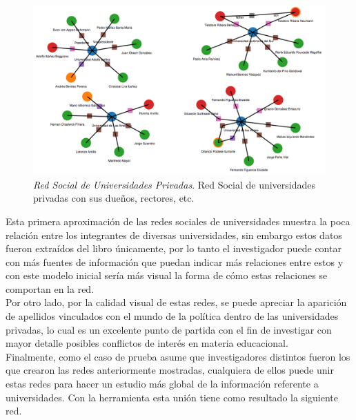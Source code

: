 \begin{figure}[H]
  \centering
  \includegraphics[width=1.0\textwidth]{images/universidades_privadas.png}
  \caption[Red Social de Universidades Privadas]{\emph{Red Social de Universidades Privadas}. Red Social de universidades privadas con sus dueños, rectores, etc.}
  \label{universidades_privadas}
\end{figure}

Esta primera aproximación de las redes sociales de universidades muestra la poca relación entre los integrantes de diversas universidades, sin embargo estos datos fueron extraídos del libro únicamente, por lo tanto el investigador puede contar con más fuentes de información que puedan indicar más relaciones entre estos y con este modelo inicial sería más visual la forma de cómo estas relaciones se comportan en la red.\\

Por otro lado, por la calidad visual de estas redes, se puede apreciar la aparición de apellidos vinculados con el mundo de la política dentro de las universidades privadas, lo cual es un excelente punto de partida con el fin de investigar con mayor detalle posibles conflictos de interés en materia educacional.\\

Finalmente, como el caso de prueba asume que investigadores distintos fueron los que crearon las redes anteriormente mostradas, cualquiera de ellos puede unir estas redes para hacer un estudio más global de la información referente a universidades. Con la herramienta esta unión tiene como resultado la siguiente red.

